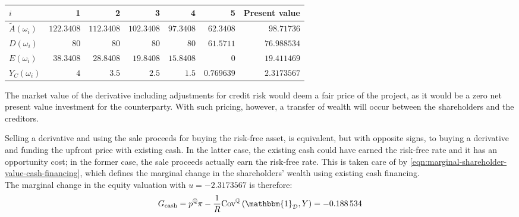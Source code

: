 \documentclass[main.tex]{subfiles}
\begin{document}
            \begin{table}[H]
                \centering
                \begin{tabular}{l|rrrrr||r}
                    $i$ & 1 & 2 & 3 & 4 & 5 & Present value \\
                    \hline
                    \rule{0pt}{1.1em}
                    $\tilde{A}(\omega_{i})$ & $\num{122.3408}$ & $\num{112.3408}$ & $\num{102.3408}$ & $\num{97.3408}$ & $\num{62.3408}$ & $\num{98.71736}$ \\
                    $D(\omega_{i})$ & $\num{80}$ & $\num{80}$ & $\num{80}$ & $\num{80}$ & $\num{61.5711}$ & $\num{76.988534}$ \\
                    $E(\omega_{i})$ & $38.3408$ & $\num{28.8408}$ & $\num{19.8408}$ & $\num{15.8408}$ & $\num{0}$ & $\num{19.411469}$ \\
                    $Y_C(\omega_{i})$ & $\num{4}$ & $\num{3.5}$ & $\num{2.5}$ & $\num{1.5}$ & $\num{0.769639}$ & $\num{2.3173567}$ \\
                \end{tabular}
                \caption{}
                \label{tbl:example-no-funding-buyback}
            \end{table}

            The market value of the derivative including adjustments for credit risk would deem a fair price of the project,
            as it would be a zero net present value investment for the counterparty.
            With such pricing, however, a transfer of wealth will occur between the shareholders and the creditors.

            Selling a derivative and using the sale proceeds for buying the risk-free asset,
            is equivalent, but with opposite signs,
            to buying a derivative and funding the upfront price with existing cash.
            In the latter case, the existing cash could have earned the risk-free rate
            and it has an opportunity cost;
            in the former case, the sale proceeds actually earn the risk-free rate.
            This is taken care of by \cref{eqn:marginal-shareholder-value-cash-financing},
            which defines the marginal change in the shareholders' wealth using existing cash financing.
            \\
            The marginal change in the equity valuation with $u=\num{-2.3173567}$ is therefore:
            \begin{equation*}
                G_{\text{cash}} = p^{\rnmeasure}\pi
                -\discountfactor \text{Cov}^{\rnmeasure}\left(\mathbbm{1}_{\mathcal{D}},Y\right) = \num{-0.188534}
            \end{equation*}
\end{document}
